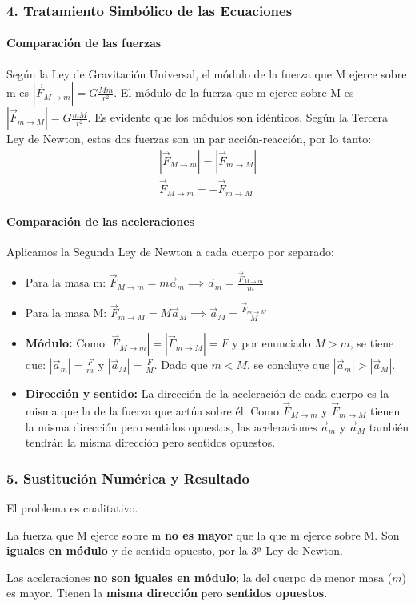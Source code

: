 \subsubsection*{4. Tratamiento Simbólico de las Ecuaciones}
\paragraph*{Comparación de las fuerzas}
Según la Ley de Gravitación Universal, el módulo de la fuerza que M ejerce sobre m es $|\vec{F}_{M \to m}| = G \frac{Mm}{r^2}$. El módulo de la fuerza que m ejerce sobre M es $|\vec{F}_{m \to M}| = G \frac{mM}{r^2}$. Es evidente que los módulos son idénticos.
Según la Tercera Ley de Newton, estas dos fuerzas son un par acción-reacción, por lo tanto:
\begin{gather}
    |\vec{F}_{M \to m}| = |\vec{F}_{m \to M}| \\
    \vec{F}_{M \to m} = -\vec{F}_{m \to M}
\end{gather}

\paragraph*{Comparación de las aceleraciones}
Aplicamos la Segunda Ley de Newton a cada cuerpo por separado:
\begin{itemize}
    \item Para la masa m: $\vec{F}_{M \to m} = m \vec{a}_m \implies \vec{a}_m = \frac{\vec{F}_{M \to m}}{m}$
    \item Para la masa M: $\vec{F}_{m \to M} = M \vec{a}_M \implies \vec{a}_M = \frac{\vec{F}_{m \to M}}{M}$
\end{itemize}
\begin{itemize}
    \item \textbf{Módulo:} Como $|\vec{F}_{M \to m}| = |\vec{F}_{m \to M}| = F$ y por enunciado $M>m$, se tiene que:
    $|\vec{a}_m| = \frac{F}{m}$ y $|\vec{a}_M| = \frac{F}{M}$. Dado que $m < M$, se concluye que $|\vec{a}_m| > |\vec{a}_M|$.
    \item \textbf{Dirección y sentido:} La dirección de la aceleración de cada cuerpo es la misma que la de la fuerza que actúa sobre él. Como $\vec{F}_{M \to m}$ y $\vec{F}_{m \to M}$ tienen la misma dirección pero sentidos opuestos, las aceleraciones $\vec{a}_m$ y $\vec{a}_M$ también tendrán la misma dirección pero sentidos opuestos.
\end{itemize}

\subsubsection*{5. Sustitución Numérica y Resultado}
El problema es cualitativo.
\begin{cajaresultado}
    La fuerza que M ejerce sobre m \textbf{no es mayor} que la que m ejerce sobre M. Son \textbf{iguales en módulo} y de sentido opuesto, por la 3ª Ley de Newton.
\end{cajaresultado}
\begin{cajaresultado}
    Las aceleraciones \textbf{no son iguales en módulo}; la del cuerpo de menor masa ($m$) es mayor. Tienen la \textbf{misma dirección} pero \textbf{sentidos opuestos}.
\end{cajaresultado}

